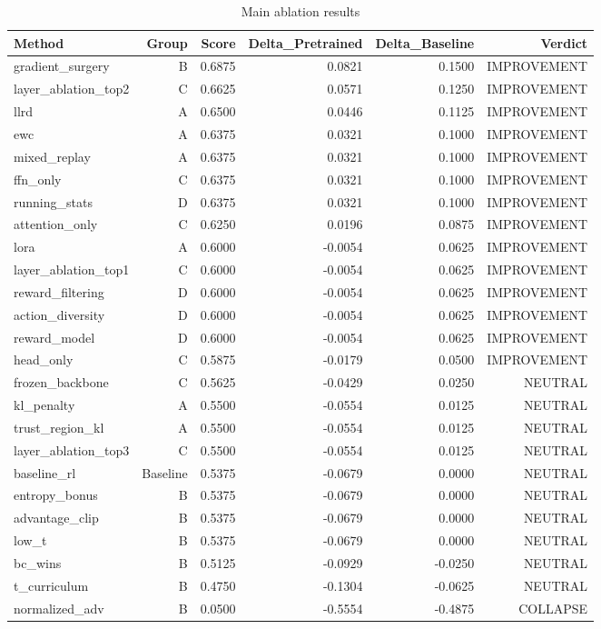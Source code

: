 \begin{table}[htbp]
\centering
\caption{Main ablation results}
\label{tab:main-results}
\begin{tabular}{lrrrrr}
\toprule
\textbf{Method} & \textbf{Group} & \textbf{Score} & \textbf{Delta\_Pretrained} & \textbf{Delta\_Baseline} & \textbf{Verdict} \\
\midrule
gradient\_surgery & B & 0.6875 & 0.0821 & 0.1500 & IMPROVEMENT \\
layer\_ablation\_top2 & C & 0.6625 & 0.0571 & 0.1250 & IMPROVEMENT \\
llrd & A & 0.6500 & 0.0446 & 0.1125 & IMPROVEMENT \\
ewc & A & 0.6375 & 0.0321 & 0.1000 & IMPROVEMENT \\
mixed\_replay & A & 0.6375 & 0.0321 & 0.1000 & IMPROVEMENT \\
ffn\_only & C & 0.6375 & 0.0321 & 0.1000 & IMPROVEMENT \\
running\_stats & D & 0.6375 & 0.0321 & 0.1000 & IMPROVEMENT \\
attention\_only & C & 0.6250 & 0.0196 & 0.0875 & IMPROVEMENT \\
lora & A & 0.6000 & -0.0054 & 0.0625 & IMPROVEMENT \\
layer\_ablation\_top1 & C & 0.6000 & -0.0054 & 0.0625 & IMPROVEMENT \\
reward\_filtering & D & 0.6000 & -0.0054 & 0.0625 & IMPROVEMENT \\
action\_diversity & D & 0.6000 & -0.0054 & 0.0625 & IMPROVEMENT \\
reward\_model & D & 0.6000 & -0.0054 & 0.0625 & IMPROVEMENT \\
head\_only & C & 0.5875 & -0.0179 & 0.0500 & IMPROVEMENT \\
frozen\_backbone & C & 0.5625 & -0.0429 & 0.0250 & NEUTRAL \\
kl\_penalty & A & 0.5500 & -0.0554 & 0.0125 & NEUTRAL \\
trust\_region\_kl & A & 0.5500 & -0.0554 & 0.0125 & NEUTRAL \\
layer\_ablation\_top3 & C & 0.5500 & -0.0554 & 0.0125 & NEUTRAL \\
baseline\_rl & Baseline & 0.5375 & -0.0679 & 0.0000 & NEUTRAL \\
entropy\_bonus & B & 0.5375 & -0.0679 & 0.0000 & NEUTRAL \\
advantage\_clip & B & 0.5375 & -0.0679 & 0.0000 & NEUTRAL \\
low\_t & B & 0.5375 & -0.0679 & 0.0000 & NEUTRAL \\
bc\_wins & B & 0.5125 & -0.0929 & -0.0250 & NEUTRAL \\
t\_curriculum & B & 0.4750 & -0.1304 & -0.0625 & NEUTRAL \\
normalized\_adv & B & 0.0500 & -0.5554 & -0.4875 & COLLAPSE \\
\bottomrule
\end{tabular}
\end{table}